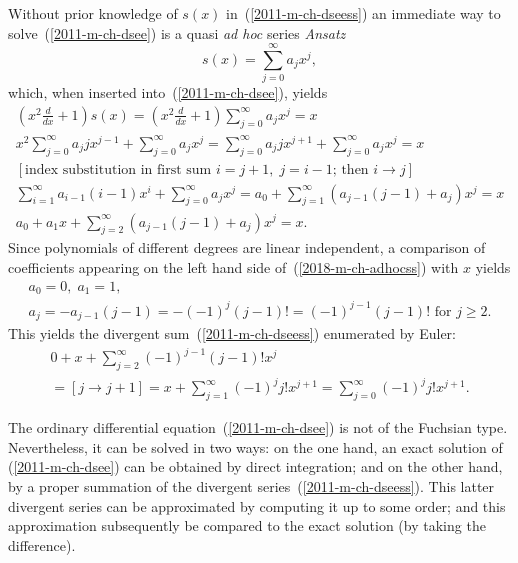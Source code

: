 Without prior knowledge of $s(x)$ in~(\ref{2011-m-ch-dseess}) an
immediate way to solve~(\ref{2011-m-ch-dsee}) is a quasi {\em ad hoc} series {\it Ansatz}
\begin{equation}
 s(x)= \sum_{j=0}^\infty a_jx^j,
\end{equation}
which, when inserted into~(\ref{2011-m-ch-dsee}), yields
\begin{equation}
\begin{split}
\left(x^2 \frac{d}{dx} +1\right) s(x) =
\left(x^2 \frac{d}{dx} +1\right) \sum_{j=0}^\infty a_jx^j = {x} \\
x^2 \sum_{j=0}^\infty a_j j x^{j-1} + \sum_{j=0}^\infty a_jx^j =
\sum_{j=0}^\infty a_j j x^{j+1} + \sum_{j=0}^\infty a_jx^j = {x} \\
  \left[\text{index substitution in first sum } i= j+1,\; j=i-1 \text{; then } i \rightarrow j\right]  \\
\sum_{i=1}^\infty a_{i-1} (i-1) x^i + \sum_{j=0}^\infty a_j x^j =
a_0 + \sum_{j=1}^\infty \left(a_{j-1} (j-1) +  a_j \right) x^j = x \\
a_0 + a_1 x + \sum_{j=2}^\infty \left(a_{j-1} (j-1) +  a_j \right) x^j = x
.
\end{split}
\label{2018-m-ch-adhocss}
\end{equation}
Since polynomials of different degrees are linear independent,
a comparison of coefficients appearing on the left hand side of~(\ref{2018-m-ch-adhocss}) with $x$
yields
\begin{equation}
\begin{split}
a_0 =0,
\;
a_1 = 1,
\\
a_j =  - a_{j-1} (j-1)  = - (-1)^j (j-1)!= (-1)^{j-1} (j-1)! \text{ for } j \ge 2
.
\end{split}
\label{2018-m-ch-adhocss1}
\end{equation}
This yields the divergent sum~(\ref{2011-m-ch-dseess}) enumerated by Euler:
\begin{equation}
\begin{split}
0+ x +\sum_{j=2}^\infty (-1)^{j-1} (j-1)! x^j \\
=[j\rightarrow j+1] = x +\sum_{j=1}^\infty (-1)^{j} j! x^{j+1}
=  \sum_{j=0}^\infty (-1)^{j} j! x^{j+1}
.
\end{split}
\label{2018-m-ch-adhocss12}
\end{equation}

The ordinary differential equation~(\ref{2011-m-ch-dsee})
is not of the Fuchsian type.
Nevertheless, it can be solved in two ways:
on the one hand, an exact solution of (\ref{2011-m-ch-dsee})
can be obtained by direct integration; and on the other hand,
by a proper summation of the divergent series~(\ref{2011-m-ch-dseess}).
This latter divergent series can be approximated by computing it up to some order;
and this approximation subsequently be compared to the exact solution (by taking
the difference).



